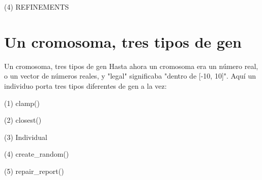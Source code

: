 \begin{frame}[fragile]{(4) REFINEMENTS}

\end{frame}


\section{Un cromosoma, tres tipos de gen}

\begin{frame}{Un cromosoma, tres tipos de gen}
Hasta ahora un cromosoma era un número real, o un vector de números reales, y
"legal" significaba "dentro de [-10, 10]". Aquí un individuo porta tres tipos
diferentes de gen a la vez:
\end{frame}

\begin{frame}[fragile]{(1) clamp()}

\end{frame}

\begin{frame}[fragile]{(2) closest()}

\end{frame}

\begin{frame}[fragile]{(3) Individual}

\end{frame}

\begin{frame}[fragile]{(4) create\_random()}

\end{frame}

\begin{frame}[fragile]{(5) repair\_report()}

\end{frame}


